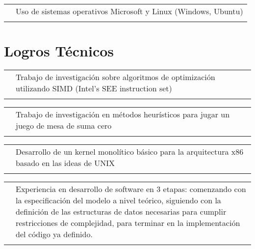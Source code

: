 \documentclass[a4paper,10pt]{article}
\newcommand{\workEntry}[5]{
\begin{tabular}{p{1.7cm}|p{11cm}}
\raggedleft \textsc{#1} & #3 \\
\raggedleft \textsc{#2} & \emph{#4} \\
& \footnotesize{#5}\\
\multicolumn{2}{c}{}\ %
\end{tabular}
}
\newcommand{\dateEntry}[4]{
\begin{tabular}{p{1.7cm}|p{11cm}}
\raggedleft \textsc{#1} & #3 \\
\raggedleft \textsc{#2} & \footnotesize{#4}\\
\multicolumn{2}{c}{}\ %
\end{tabular}
}
\newcommand{\resEntry}[1]{
\begin{tabular}{p{1.7cm}|p{11cm}}
& #1 \\
\multicolumn{2}{c}{}\
\end{tabular}
}
\begin{document}
\resEntry{Uso de sistemas operativos Microsoft y Linux (Windows, Ubuntu)}{}

\section{Logros Técnicos}

\resEntry{Trabajo de investigación sobre algoritmos de optimización utilizando SIMD (Intel's SEE instruction set)}{}

\resEntry{Trabajo de investigación en métodos heurísticos para jugar un juego de mesa de suma cero}{}

\resEntry{Desarrollo de un kernel monolítico básico para la arquitectura x86 basado en las ideas de UNIX}{}

\resEntry{Experiencia en desarrollo de software en 3 etapas: comenzando con la especificación del modelo a nivel teórico, siguiendo con la definición de las estructuras de datos necesarias para cumplir restricciones de complejidad, para terminar en la implementación del código ya definido.}{}





\end{document}
